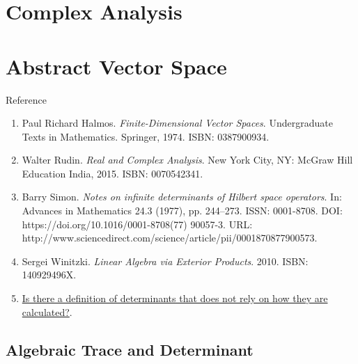 \documentclass{treatise}
\begin{document}
\begin{shaded}
\newpage

\chapter{Complex Analysis}
\begin{theorem}
\end{theorem}

\chapter{Abstract Vector Space}
Reference
\begin{enumerate}
	\item Paul Richard Halmos. \textit{Finite-Dimensional Vector Spaces}. Undergraduate Texts in Mathematics. Springer, 1974. ISBN: 0387900934.
	\item Walter Rudin. \textit{Real and Complex Analysis}. New York City, NY: McGraw Hill Education India, 2015. ISBN: 0070542341.
	\item Barry Simon. \textit{Notes on infinite determinants of Hilbert space operators}. In: Advances in Mathematics 24.3 (1977), pp. 244–273. ISSN: 0001-8708. DOI: https://doi.org/10.1016/0001-8708(77) 90057-3. URL: http://www.sciencedirect.com/science/article/pii/0001870877900573.
	\item Sergei Winitzki. \textit{Linear Algebra via Exterior Products}. 2010. ISBN: 140929496X.
	\item \href{https://math.stackexchange.com/questions/21614/is-there-a-definition-of-determinants-that-does-not-rely-on-how-they-are-calcula}{Is there a definition of determinants that does not rely on how they are calculated?}.
\end{enumerate}

\section{Algebraic Trace and Determinant}

\end{shaded}
\end{document}
